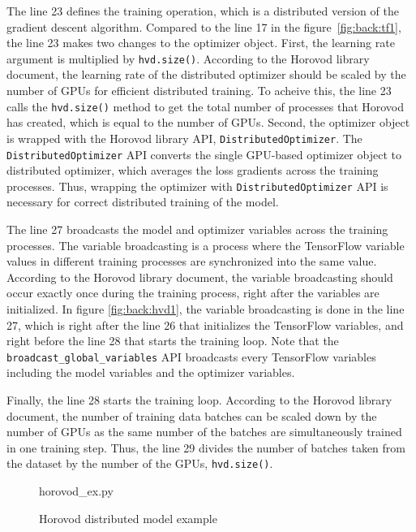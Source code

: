 The line 23 defines the training operation, 
which is a distributed version of the gradient descent algorithm.
Compared to the line 17 in the figure~\ref{fig:back:tf1},
the line 23 makes two changes to the optimizer object.
First, the learning rate argument is multiplied by {\tt hvd.size()}.
According to the Horovod library document,
the learning rate of the distributed optimizer 
should be scaled by the number of GPUs for efficient distributed training.
To acheive this, the line 23 calls the {\tt hvd.size()} method to
get the total number of processes that Horovod has created,
which is equal to the number of GPUs.
Second, the optimizer object is wrapped with the Horovod library API,
{\tt DistributedOptimizer}.
The {\tt DistributedOptimizer} API converts the single GPU-based optimizer 
object to distributed optimizer, which averages the loss gradients across the
training processes.
Thus, wrapping the optimizer with {\tt DistributedOptimizer} API is necessary
for correct distributed training of the model.

The line 27 broadcasts the model and optimizer variables across the training
processes.
The variable broadcasting is a process where the TensorFlow 
variable values in different training processes are synchronized into
the same value.
According to the Horovod library document, the variable broadcasting
should occur exactly once during the training process,
right after the variables are initialized.
In figure \ref{fig:back:hvd1}, the variable broadcasting is done in the line 27,
which is right after the line 26 that initializes the TensorFlow variables,
and right before the line 28 that starts the training loop.
Note that the {\tt broadcast\_global\_variables} API broadcasts every
TensorFlow variables including the model variables and the optimizer
variables.

Finally, the line 28 starts the training loop.
According to the Horovod library document, the number of training data
batches can be scaled down by the number of GPUs as the same number of
the batches are simultaneously trained in one training step.
Thus, the line 29 divides the number of batches taken from the dataset
by the number of the GPUs, {\tt hvd.size()}.


\begin{figure}[ht!]
 
{horovod_ex.py}
  \caption{Horovod distributed model example}
\label{fig:back:hvd2} 
\end{figure}

